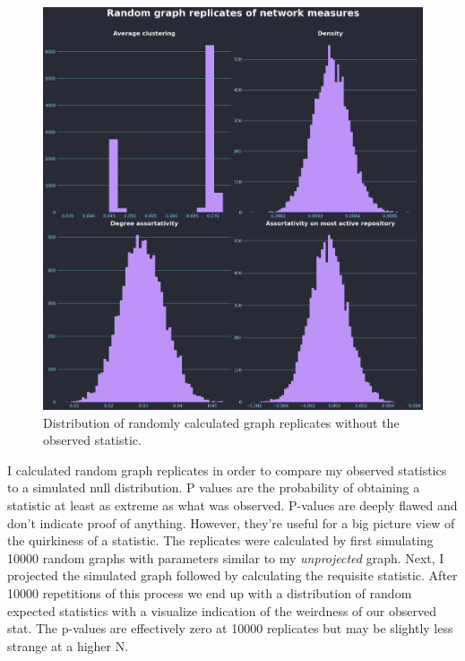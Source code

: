 \documentclass[12pt, a4paper]{article}
\begin{document}
\begin{figure}
    \includegraphics[width=\linewidth]{metrics_dist.png}
    \caption{Distribution of randomly calculated graph replicates without the observed statistic.}
    \label{fig:metricsdist}
\end{figure}

I calculated random graph replicates in order to compare my observed statistics to a simulated null distribution. P values are the probability of obtaining a statistic at least as extreme as what was observed. P-values are deeply flawed and don't indicate proof of anything. However, they're useful for a big picture view of the quirkiness of a statistic. The replicates were calculated by first simulating 10000 random graphs with parameters similar to my \textit{unprojected} graph. Next, I projected the simulated graph followed by calculating the requisite statistic. After 10000 repetitions of this process we end up with a distribution of random expected statistics with a visualize indication of the weirdness of our observed stat. The p-values are effectively zero at 10000 replicates but may be slightly less strange at a higher N.
\end{document}
